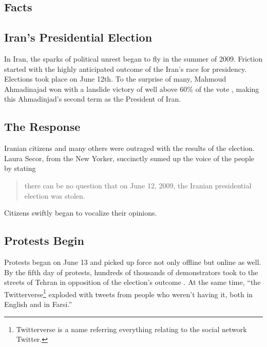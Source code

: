 \documentclass[11pt]{article}
\begin{document}
\begin{multicols}{2}
\setcounter{page}{1}
\section{Facts} 

\subsection{Iran's Presidential Election}

In Iran, the sparks of political unrest began to fly in the summer of 2009.
Friction started with the highly anticipated outcome of the Iran's race for
presidency. Elections took place on June 12th. To the surprise of many, Mahmoud
Ahmadinajad won with a lanslide victory of well above 60\% of the vote
\cite{TheIranianVote, IranianElectionResultsByProvince}, making this
Ahmadinjad's second term as the President of Iran.

\subsection{The Response}

Iranian citizens and many others were outraged with the results of the election.
Laura Secor, from the New Yorker, succinctly sumed up the voice of the people by
stating \begin{quotation} there can be no question that on June 12, 2009, the Iranian
presidential election was stolen. \cite{TheIranianVote}\end{quotation} Citizens
swiftly began to vocalize their opinions.

\subsection{Protests Begin}

Protests began on June 13 and picked up force not only offline but online as
well. By the fifth day of protests, hundreds of thousands of demonstrators took to
the streets of Tehran in opposition of the election's outcome
\cite{IranProtestsFifthDayOfUnrest}. At the same time, ``the
Twitterverse\footnote{Twitterverse is a name referring everything relating to
the social network Twitter.} exploded with tweets from people who weren't having
it, both in English and in Farsi.'' \cite{WhyTwitterIsTheMedium}


\end{multicols}
\end{document}
